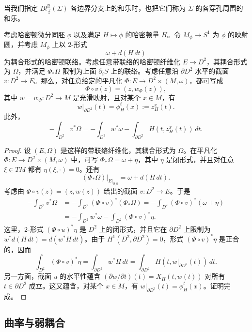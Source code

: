 当我们指定 $Bl_{\vec z}^{\mathbb R}(\Sigma)$ 各边界分支上的和乐时，也把它们称为 $\dot\Sigma$ 的各穿孔周围的和乐。

\begin{lemma}\label{lem:horizontal-section-coupling-area}
考虑哈密顿微分同胚 $\phi$ 以及满足 $H\mapsto\phi$ 的哈密顿量
$H$。令 $M_\phi\to S^1$ 为 $\phi$ 的映射圆，并考虑 $M_\phi$ 上以
$2$-形式
\[
 \omega+d(H\,dt)
\]
为耦合形式的哈密顿联络。考虑任意带联络的哈密顿纤维化
$E\to D^2$，其耦合形式为 $\Omega$，并满足 $\Phi_*\Omega$ 限制为上面
$\partial_iS$ 上的联络。考虑任意沿 $\partial D^2$ 水平的截面
$v:D^2\to E$。那么，对任意给定的平凡化
$\Phi:E\to D^2\times(M,\omega)$，都可写成
\[
 \Phi\circ v(z)=(z,w_\Phi(z)),
\]
其中 $w=w_\Phi:D^2\to M$ 是光滑映射，且对某个 $x\in M$，有
\[
 w|_{\partial D^2}(t)=\phi_H^t(x):=z_H^x(t).
\]
此外，
\begin{equation}
 -\int_{D^2}v^*\Omega
 =-\int_{D^2}w^*\omega
  -\int_{\partial D^2}H(t,z_H^x(t))\,dt.
 \label{eq:horizontal-section-coupling-area}
\end{equation}
\end{lemma}

\begin{proof}
设 $(E,\Omega)$ 是这样的带联络纤维化，其耦合形式为 $\Omega$。在平凡化
$\Phi:E\to D^2\times(M,\omega)$ 中，可写
$\Phi_*\Omega=\omega+\eta$，其中 $\eta$ 是闭形式，并且对任意
$\xi\in TM$ 都有 $\eta(\xi,\mathord\cdot)=0$。还有
\[
 (\Phi_*\Omega)|_{E|_{\partial_iS}}=\omega+d(H\,dt).
\]
考虑由 $\Phi\circ v(z)=(z,w(z))$ 给出的截面 $v:D^2\to E$。于是
\[
\begin{aligned}
 -\int_{D^2}v^*\Omega
 &=-\int_{D^2}(\Phi\circ v)^*(\Phi_*\Omega)
   =-\int_{D^2}(\Phi\circ v)^*(\omega+\eta)\\
 &=-\int_{D^2}w^*\omega
   -\int_{D^2}(\Phi\circ v)^*\eta.
\end{aligned}
\]
这里，$2$-形式 $(\Phi\circ u)^*\eta$ 是 $D^2$ 上的闭形式，并且它在
$\partial D^2$ 上限制为
$w^*d(H\,dt)=d(w^*H\,dt)$。由于
$H^1(D^2,\partial D^2)=0$，形式 $(\Phi\circ v)^*\eta$ 是正合的，因而
\[
 \int_{D^2}(\Phi\circ v)^*\eta
 =\int_{\partial D^2}w^*H\,dt
 =\int_{\partial D^2}H(t,w|_{\partial D^2}(t))\,dt.
\]
另一方面，截面 $u$ 的水平性蕴含
$(\partial w/\partial t)(t)=X_H(t,w(t))$ 对所有 $t\in\partial D^2$ 成立。这又蕴含，对某个 $x\in M$，有
$w|_{\partial D^2}(t)=\phi_H^t(x)$。证明完成。
\end{proof}

\subsection{曲率与弱耦合}
\label{subsec:curvature-weak-couplings}

